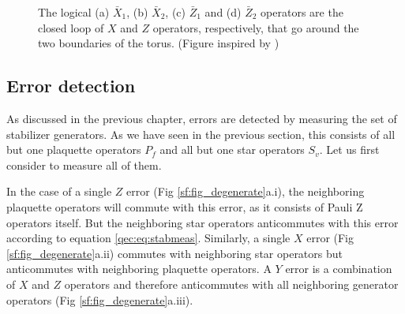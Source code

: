 \begin{figure}
  \centering
  \hspace{1cm}
  \caption{The logical (a) $\bar{X}_1$, (b) $\bar{X}_2$, (c) $\bar{Z}_1$ and (d) $\bar{Z}_2$ operators are the closed loop of $X$ and $Z$ operators, respectively, that go around the two boundaries of the torus. (Figure inspired by \cite{browne})}\label{sf:fig_logical}
\end{figure}

\subsection{Error detection}
As discussed in the previous chapter, errors are detected by measuring the set of stabilizer generators. As we have seen in the previous section, this consists of all but one plaquette operators $P_f$ and all but one star operators $S_v$. Let us first consider to measure all of them.

In the case of a single $Z$ error (Fig \ref{sf:fig_degenerate}a.i), the neighboring plaquette operators will commute with this error, as it consists of Pauli Z operators itself. But the neighboring star operators anticommutes with this error according to equation \eqref{qec:eq:stabmeas}. Similarly, a single $X$ error (Fig \ref{sf:fig_degenerate}a.ii) commutes with neighboring star operators but anticommutes with neighboring plaquette operators. A $Y$ error is a combination of $X$ and $Z$ operators and therefore anticommutes with all neighboring generator operators (Fig \ref{sf:fig_degenerate}a.iii).

